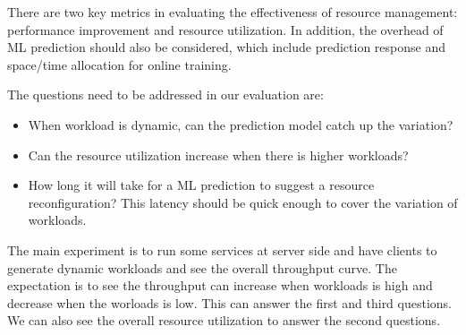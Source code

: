 There are two key metrics in evaluating the effectiveness of resource
management: performance improvement and resource utilization.  In
addition, the overhead of ML prediction should also be considered,
which include prediction response and space/time allocation for
online training.

The questions need to be addressed in our evaluation are:
\begin{itemize}
\item When workload is dynamic, can the prediction model catch up the
variation?

\item Can the resource utilization increase when there is higher
workloads?

\item How long it will take for a ML prediction to suggest a resource
reconfiguration?  This latency should be quick enough to cover the
variation of workloads.
\end{itemize}

The main experiment is to run some services at server side and have
clients to generate dynamic workloads and see the overall throughput
curve.  The expectation is to see the throughput can increase when
workloads is high and decrease when the worloads is low.  This can
answer the first and third questions.  We can also see the overall
resource utilization to answer the second questions.

